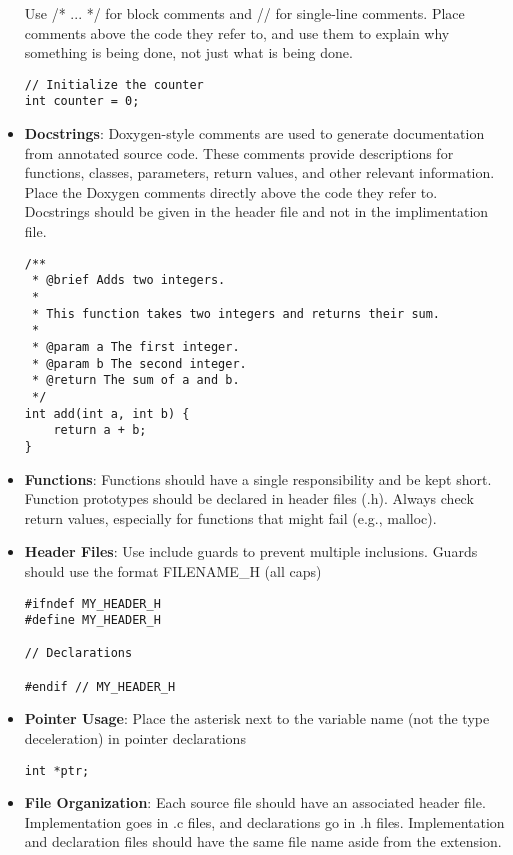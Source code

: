 \documentclass{ol-softwaremanual}
\begin{document}
\begin{itemize}
    Use /* ... */ for block comments and // for single-line comments.
    Place comments above the code they refer to, and use them to explain why something is being done, not just what is being done.
\begin{example}
\begin{verbatim}
// Initialize the counter
int counter = 0;
\end{verbatim}
\end{example}
\item \textbf{Docstrings}:
Doxygen-style comments are used to generate documentation from annotated source code. These comments provide descriptions for functions, classes, parameters, return values, and other relevant information. Place the Doxygen comments directly above the code they refer to. Docstrings should be given in the header file and not in the implimentation file.
\begin{example}[Docstrings]
\begin{verbatim}
/**
 * @brief Adds two integers.
 *
 * This function takes two integers and returns their sum.
 *
 * @param a The first integer.
 * @param b The second integer.
 * @return The sum of a and b.
 */
int add(int a, int b) {
    return a + b;
}
\end{verbatim}
\end{example}
\item \textbf{Functions}: Functions should have a single responsibility and be kept short. Function prototypes should be declared in header files (.h). Always check return values, especially for functions that might fail (e.g., malloc).

\item \textbf{Header Files}: Use include guards to prevent multiple inclusions. Guards should use the format FILENAME\_H (all caps)
\begin{example}
\begin{verbatim}
#ifndef MY_HEADER_H
#define MY_HEADER_H

// Declarations

#endif // MY_HEADER_H
\end{verbatim}
\end{example}

\item \textbf{Pointer Usage}: Place the asterisk next to the variable name (not the type deceleration) in pointer declarations
\begin{example}
\begin{verbatim}
int *ptr;
\end{verbatim}
\end{example}
\item \textbf{File Organization}: Each source file should have an associated header file. Implementation goes in .c files, and declarations go in .h files. Implementation and declaration files should have the same file name aside from the extension.
\end{itemize}
\end{document}
